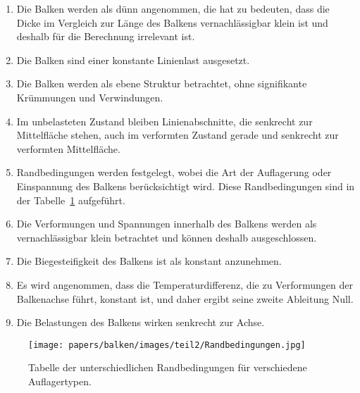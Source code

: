 \begin{enumerate}
	\item Die Balken werden als dünn angenommen, die hat zu bedeuten, dass die Dicke im Vergleich zur Länge des Balkens vernachlässigbar klein ist und deshalb für die Berechnung irrelevant ist.
	
	\item Die Balken sind einer konstante Linienlast ausgesetzt.
	
	\item Die Balken werden als ebene Struktur betrachtet, ohne signifikante Krümmungen und Verwindungen.
	
	\item Im unbelasteten Zustand bleiben Linienabschnitte, die senkrecht zur Mittelfläche stehen, auch im verformten Zustand gerade und senkrecht zur verformten Mittelfläche.
	
	\item Randbedingungen werden festgelegt, wobei die Art der Auflagerung oder Einspannung des Balkens berücksichtigt wird.
	Diese Randbedingungen sind in der Tabelle~\ref{balken:tabelle:rb} aufgeführt.
	
	\item Die Verformungen und Spannungen innerhalb des Balkens werden als vernachlässigbar klein betrachtet und können deshalb ausgeschlossen.
	
	\item Die Biegesteifigkeit des Balkens ist als konstant anzunehmen.
	
	\item Es wird angenommen, dass die Temperaturdifferenz, die zu Verformungen der Balkenachse führt, konstant ist, und daher ergibt seine zweite Ableitung Null.
	
	\item Die Belastungen des Balkens wirken senkrecht zur Achse.
\end{enumerate}
\begin{figure}
\begin{center}
	\texttt{[image: papers/balken/images/teil2/Randbedingungen.jpg]}
\end{center}
\caption{Tabelle der unterschiedlichen Randbedingungen für verschiedene Auflagertypen.
\label{balken:tabelle:rb}}
\end{figure}
